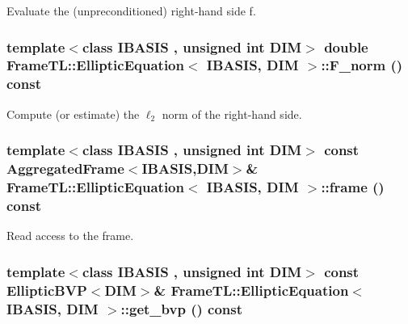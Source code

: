 Evaluate the (unpreconditioned) right-hand side f. \hypertarget{classFrameTL_1_1EllipticEquation_1c6e0bd3bc27368aca7ea68c7baee8a1}{
\subsubsection[{F\_\-norm}]{\setlength{\rightskip}{0pt plus 5cm}template$<$class IBASIS , unsigned int DIM$>$ double {\bf FrameTL::EllipticEquation}$<$ IBASIS, DIM $>$::F\_\-norm () const}}
\label{classFrameTL_1_1EllipticEquation_1c6e0bd3bc27368aca7ea68c7baee8a1}


Compute (or estimate) the $\ell_2$ norm of the right-hand side. \hypertarget{classFrameTL_1_1EllipticEquation_49f035460f9c0a08ed1a292bf6d3e7f9}{
\subsubsection[{frame}]{\setlength{\rightskip}{0pt plus 5cm}template$<$class IBASIS , unsigned int DIM$>$ const {\bf AggregatedFrame}$<$IBASIS,DIM$>$\& {\bf FrameTL::EllipticEquation}$<$ IBASIS, DIM $>$::frame () const}}
\label{classFrameTL_1_1EllipticEquation_49f035460f9c0a08ed1a292bf6d3e7f9}


Read access to the frame. \hypertarget{classFrameTL_1_1EllipticEquation_7574a07220674516f1be1fd38b3fb4cc}{
\subsubsection[{get\_\-bvp}]{\setlength{\rightskip}{0pt plus 5cm}template$<$class IBASIS , unsigned int DIM$>$ const EllipticBVP$<$DIM$>$\& {\bf FrameTL::EllipticEquation}$<$ IBASIS, DIM $>$::get\_\-bvp () const}}
\label{classFrameTL_1_1EllipticEquation_7574a07220674516f1be1fd38b3fb4cc}


